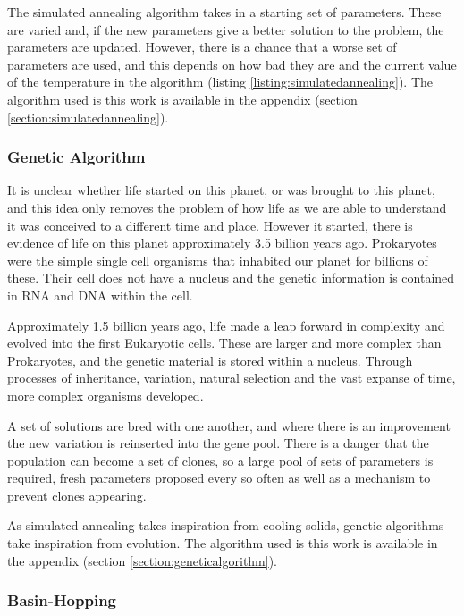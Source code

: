 The simulated annealing algorithm takes in a starting set of parameters.  These are varied and, if the new parameters give a better solution to the problem, the parameters are updated.  However, there is a chance that a worse set of parameters are used, and this depends on how bad they are and the current value of the temperature in the algorithm (listing \ref{listing:simulatedannealing}).  The algorithm used is this work is available in the appendix (section \ref{section:simulatedannealing}).


\subsubsection{Genetic Algorithm}
\label{section:optgeneticalgorithm}

It is unclear whether life started on this planet, or was brought to this planet, and this idea only removes the problem of how life as we are able to understand it was conceived to a different time and place.  However it started, there is evidence of life on this planet approximately 3.5 billion years ago.  Prokaryotes were the simple single cell organisms that inhabited our planet for billions of these.  Their cell does not have a nucleus and the genetic information is contained in RNA and DNA within the cell.

Approximately 1.5 billion years ago, life made a leap forward in complexity and evolved into the first Eukaryotic cells.  These are larger and more complex than Prokaryotes, and the genetic material is stored within a nucleus.  Through processes of inheritance, variation, natural selection and the vast expanse of time, more complex organisms developed.

A set of solutions are bred with one another, and where there is an improvement the new variation is reinserted into the gene pool.  There is a danger that the population can become a set of clones, so a large pool of sets of parameters is required, fresh parameters proposed every so often as well as a mechanism to prevent clones appearing.

As simulated annealing takes inspiration from cooling solids, genetic algorithms take inspiration from evolution.  The algorithm used is this work is available in the appendix (section \ref{section:geneticalgorithm}).


\subsubsection{Basin-Hopping}

